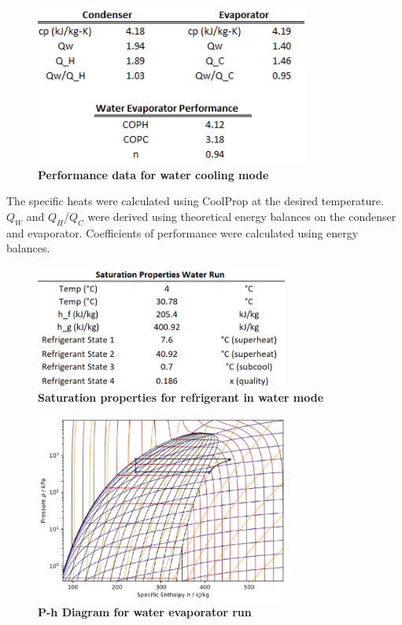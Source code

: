 \documentclass{article}
\begin{document}
\begin{figure} [H]
	\centering
	\includegraphics[width=0.8\textwidth]{W_performance}
	\caption{\textbf{Performance data for water cooling mode}}
\end{figure}
The specific heats were calculated using CoolProp at the desired temperature. $Q_W$ and $Q_H$/$Q_C$ were derived using theoretical energy balances on the condenser and evaporator. Coefficients of performance were calculated using energy balances. 

\begin{figure} [H]
	\centering
	\includegraphics[width=0.74\textwidth]{W_saturationProps}
	\caption{\textbf{Saturation properties for refrigerant in water mode}}
\end{figure}

\begin{figure} [H]
	\centering
	\includegraphics[width=0.75\textwidth]{ph_water}
	\caption{\textbf{P-h Diagram for water evaporator run}}
\end{figure}
\end{document}
